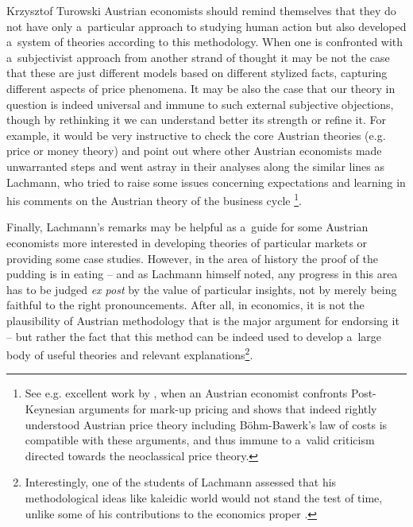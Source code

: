 \begin{artengenv}{Krzysztof Turowski}
Austrian economists should remind themselves that they do not have only a~particular approach to studying human action but also developed a~system of theories according to this methodology.
When one is confronted with a~subjectivist approach from another strand of thought it may be not the case that these are just different models based on different stylized facts, capturing different aspects of price phenomena.
It may be also the case that our theory in question is indeed universal and immune to such external subjective objections, though by rethinking it we can understand better its strength or refine it. For example, it would be very instructive to check the core Austrian theories (e.g. price or money theory) and point out where other Austrian economists made unwarranted steps and went astray in their analyses along the similar lines as Lachmann, who tried to raise some issues concerning expectations and learning in his comments on the Austrian theory of the business cycle \parencite[123--124]{lachmann-expectations}\footnote{See e.g. excellent work by \textcite{machaj-postkeynesian}, when an Austrian economist confronts Post-Keynesian arguments for mark-up pricing and shows that indeed rightly understood Austrian price theory including B\"ohm-Bawerk's law of costs is compatible with these arguments, and thus immune to a~valid criticism directed towards the neoclassical price theory.}.

Finally, Lachmann's remarks may be helpful as a~guide for some Austrian economists more interested in developing theories of particular markets or providing some case studies.
However, in the area of history the proof of the pudding is in eating -- and as Lachmann himself noted, any progress in this area has to be judged \emph{ex post} by the value of particular insights, not by merely being faithful to the right pronouncements.
After all, in economics, it is not the plausibility of Austrian methodology that is the major argument for endorsing it -- but rather the fact that this method can be indeed used to develop a~large body of useful theories and relevant explanations\footnote{Interestingly, one of the students of Lachmann assessed that his methodological ideas like kaleidic world would not stand the test of time, unlike some of his contributions to the economics proper \parencite[388]{boehm2000professor}.}.








\end{artengenv}

